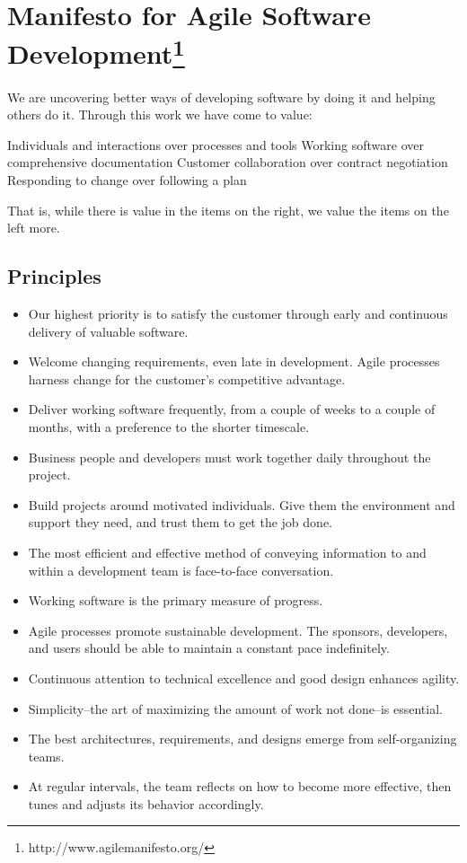 \documentclass[]{article}
\begin{document}
\section*{Manifesto for Agile Software Development\footnote{http://www.agilemanifesto.org/}}

We are uncovering better ways of developing
software by doing it and helping others do it.
Through this work we have come to value:

Individuals and interactions over processes and tools
Working software over comprehensive documentation
Customer collaboration over contract negotiation
Responding to change over following a plan

That is, while there is value in the items on
the right, we value the items on the left more.

\vspace{5mm}

\subsection*{Principles}

\begin{itemize}
	\item Our highest priority is to satisfy the customer through early and continuous delivery of valuable software.
	\item Welcome changing requirements, even late in development. Agile processes harness change for the customer's competitive advantage.
	\item Deliver working software frequently, from a couple of weeks to a couple of months, with a preference to the shorter timescale.
	\item Business people and developers must work together daily throughout the project.
	\item Build projects around motivated individuals. Give them the environment and support they need, and trust them to get the job done.
	\item The most efficient and effective method of conveying information to and within a development team is face-to-face conversation.
	\item Working software is the primary measure of progress.
	\item Agile processes promote sustainable development. The sponsors, developers, and users should be able to maintain a constant pace indefinitely.
	\item Continuous attention to technical excellence and good design enhances agility.
	\item Simplicity--the art of maximizing the amount of work not done--is essential.
	\item The best architectures, requirements, and designs emerge from self-organizing teams.
	\item At regular intervals, the team reflects on how to become more effective, then tunes and adjusts its behavior accordingly.
	
\end{itemize}
\end{document}
